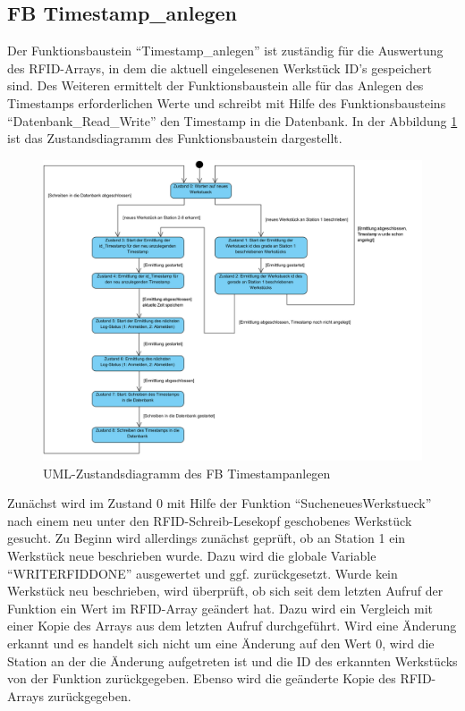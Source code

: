 \subsection{FB Timestamp\_anlegen}\label{kap:FB_Timestamp}
Der Funktionsbaustein "`Timestamp\_anlegen"' ist zuständig für die Auswertung des RFID-Arrays, in dem die aktuell eingelesenen Werkstück ID's gespeichert sind. Des Weiteren ermittelt der Funktionsbaustein alle für das Anlegen des Timestamps erforderlichen Werte und schreibt mit Hilfe des Funktionsbausteins "`Datenbank\_Read\_Write"' den Timestamp in die Datenbank. In der Abbildung \ref{fig:FB_Timestamp_anlegen} ist das Zustandsdiagramm des Funktionsbaustein dargestellt. 

\begin{figure}[h]
	    \centering
	    \includegraphics[width=1\linewidth]{Bilder/Zustandsdiagramme/Zustandsautomat_Timestamp.png}
        \caption{UML-Zustandsdiagramm des FB Timestamp\textunderscore anlegen}
        \label{fig:FB_Timestamp_anlegen}
\end{figure}

Zunächst wird im  Zustand 0 mit Hilfe der Funktion "`Suche\textunderscore neues\textunderscore Werkstueck"' nach einem neu unter den RFID-Schreib-Lesekopf geschobenes Werkstück gesucht. Zu Beginn wird allerdings zunächst geprüft, ob an Station 1 ein Werkstück neue beschrieben wurde. Dazu wird die globale Variable "`WRITE\textunderscore RFID\textunderscore DONE"' ausgewertet und ggf. zurückgesetzt. Wurde kein Werkstück neu beschrieben, wird überprüft, ob sich seit dem letzten Aufruf der Funktion ein Wert im RFID-Array geändert hat. Dazu wird ein Vergleich mit einer Kopie des Arrays aus dem letzten Aufruf durchgeführt. Wird eine Änderung erkannt und es handelt sich nicht um eine Änderung auf den Wert 0, wird die Station an der die Änderung aufgetreten ist und die ID des erkannten Werkstücks von der Funktion zurückgegeben. Ebenso wird die geänderte  Kopie des RFID-Arrays zurückgegeben.

